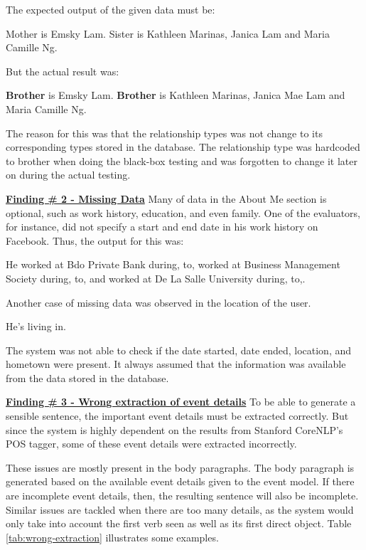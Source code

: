 The expected output of the given data must be:

\begin{center}Mother is Emsky Lam. Sister is Kathleen Marinas, Janica Lam and Maria Camille Ng.\end{center}

But the actual result was:
	
\begin{center} \textbf{Brother} is Emsky Lam. \textbf{Brother} is Kathleen Marinas, Janica Mae Lam and Maria Camille Ng.\end{center}

The reason for this was that the relationship types was not change to its corresponding types stored in the database. The relationship type was hardcoded to brother when doing the black-box testing and was forgotten to change it later on during the actual testing. 

\underline{\textbf{Finding \# 2 - Missing Data}}
Many of data in the About Me section is optional, such as work history, education, and even family. One of the evaluators, for instance, did not specify a start and end date in his work history on Facebook. Thus, the output for this was:

\begin{center}He worked at Bdo Private Bank during, to, worked at Business Management Society during, to, and worked at De La Salle University during, to,.\end{center}

Another case of missing data was observed in the location of the user.

\begin{center}He's living in.\end{center}

The system was not able to check if the date started, date ended, location, and hometown were present. It always assumed that the information was available from the data stored in the database.


\underline{\textbf{Finding \# 3 - Wrong extraction of event details}}
To be able to generate a sensible sentence, the important event details must be extracted correctly. But since the system is highly dependent on the results from Stanford CoreNLP's POS tagger, some of these event details were extracted incorrectly.

These issues are mostly present in the body paragraphs. The body paragraph is generated based on the available event details given to the event model. If there are incomplete event details, then, the resulting sentence will also be incomplete. Similar issues are tackled when there are too many details, as the system would only take into account the first verb seen as well as its first direct object. Table \ref{tab:wrong-extraction} illustrates some examples.

